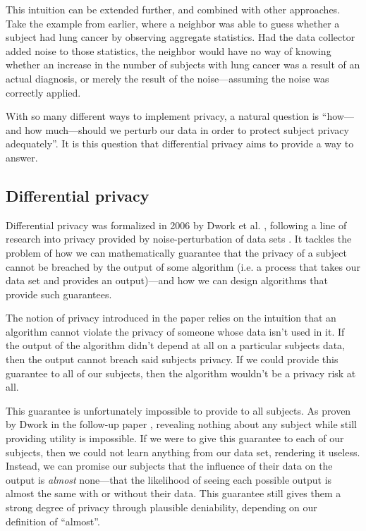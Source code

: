 \documentclass[12pt]{article}
\begin{document}
This intuition can be extended further, and combined with other approaches. Take the example from earlier, where a neighbor was able to guess whether a subject had lung cancer by observing aggregate statistics. Had the data collector added noise to those statistics, the neighbor would have no way of knowing whether an increase in the number of subjects with lung cancer was a result of an actual diagnosis, or merely the result of the noise---assuming the noise was correctly applied. \bigskip

With so many different ways to implement privacy, a natural question is ``how---and how much---should we perturb our data in order to protect subject privacy adequately''. It is this question that differential privacy aims to provide a way to answer.

\subsection{Differential privacy \label{sec:promise}}

Differential privacy was formalized in 2006 by Dwork et al. \cite{dworketal2006}, following a line of research into privacy provided by noise-perturbation of data sets \cite{precursor_2003,precursor_2004,precusor_2005}. It tackles the problem of how we can mathematically guarantee that the privacy of a subject cannot be breached by the output of some algorithm (i.e. a process that takes our data set and provides an output)---and how we can design algorithms that provide such guarantees.

The notion of privacy introduced in the paper relies on the intuition that an algorithm cannot violate the privacy of someone whose data isn't used in it. If the output of the algorithm didn't depend at all on a particular subjects data, then the output cannot breach said subjects privacy. If we could provide this guarantee to all of our subjects, then the algorithm wouldn't be a privacy risk at all.

This guarantee is unfortunately impossible to provide to all subjects. As proven by Dwork in the follow-up paper \cite{dwork2006_diffpriv}, revealing nothing about any subject while still providing utility is impossible. If we were to give this guarantee to each of our subjects, then we could not learn anything from our data set, rendering it useless. Instead, we can promise our subjects that the influence of their data on the output is \emph{almost} none---that the likelihood of seeing each possible output is almost the same with or without their data. This guarantee still gives them a strong degree of privacy through plausible deniability, depending on our definition of ``almost''. \bigskip
\end{document}
